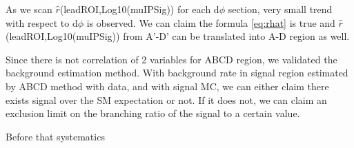As we scan $\hat{r}$(leadROI,Log10(muIPSig)) for each d$\phi$ section, very small trend with respect to d$\phi$ is observed.
We can claim the formula \ref{eq:rhat} is true and $\hat{r}$(leadROI,Log10(muIPSig)) from A'-D' can be translated into A-D region as well.


Since there is not correlation of 2 variables for ABCD region, we validated the background estimation method.
With background rate in signal region estimated by ABCD method with data, and with signal MC, we can either claim there exists signal over the SM expectation or not.
If it does not, we can claim an exclusion limit on the branching ratio of the signal to a certain value.


Before that systematics



